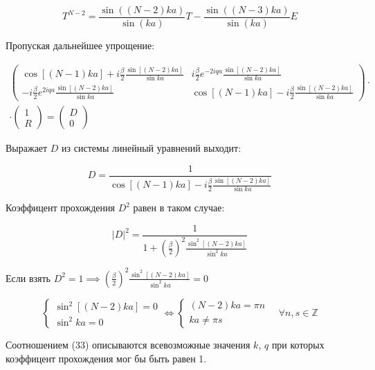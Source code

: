 \documentclass[a4paper, 12pt]{article}
\begin{document}
	\begin{equation}
		T^{N-2} = \dfrac{\sin\left((N-2)ka\right)}{\sin{(ka)}} T - \dfrac{\sin\left((N-3)ka\right)}{\sin{(ka)}} E
	\end{equation}
	
	\quad Пропуская дальнейшее упрощение: 
	
	\begin{center}
		\begin{multline*}
			\left(\begin{array}{cc}
				\cos[(N-1)ka] + i\displaystyle\frac{\beta}{2}\frac{\sin[(N-2)ka]}{\sin ka} & i\displaystyle\frac{\beta}{2}e^{-2iqa}\frac{\sin[(N-2) ka]}{\sin ka} \\[10pt]
				-i\displaystyle\frac{\beta}{2}e^{2iqa}\frac{\sin[(N-2) ka]}{\sin ka} & \cos[(N-1) ka] - i\displaystyle\frac{\beta}{2}\frac{\sin[(N-2) ka]}{\sin ka}
			\end{array}\right) \cdot \\ \cdot
			\left(\begin{array}{c}
				1 \\ R
			\end{array}\right)
			=
			\left(\begin{array}{c}
				D \\ 0
			\end{array}\right)
		\end{multline*}
	\end{center}
	
	\quad Выражает $D$ из системы линейный уравнений выходит: 
	
	\begin{equation}
		D = \frac{1}{\cos[(N-1) ka] - i\displaystyle\frac{\beta}{2}\frac{\sin[(N-2) ka]}{\sin ka}}
	\end{equation}
	
	\quad Коэффицент прохождения $D^2$ равен в таком случае: 
	
	\begin{equation}
		|D|^2 = \frac{1}{1 + \left(\displaystyle\frac{\beta}{2}\right)^2 \displaystyle\frac{\sin^2[(N-2) ka]}{\sin^2 ka}}
	\end{equation}
	
	\quad Если взять $D^2 = 1 \implies  \left(\displaystyle\frac{\beta}{2}\right)^2 \displaystyle\frac{\sin^2[(N-2) ka]}{\sin^2 ka} = 0$
	
	\begin{equation}
		\begin{cases}
			\sin^2 [(N-2)ka] = 0 \\
			\sin^2 ka = 0 
		\end{cases} \Leftrightarrow \begin{cases}
			(N-2)ka = \pi n \\
			ka \neq \pi s
		\end{cases} \quad \forall n, s \in \mathbb{Z}
	\end{equation}
	
	\quad Соотношением (33) описываются всевозможные значения $k$, $q$ при которых коэффицент прохождения мог бы быть равен 1. 
	
	

	
\end{document}
